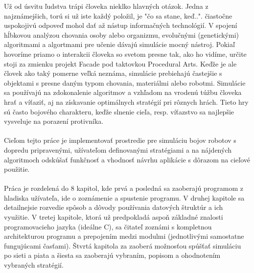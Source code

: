 \indent Už od úsvitu ľudstva trápi človeka nieklko hlavných otázok. Jedna z najznámejšich, torú si už iste každý položil, je "čo sa stane, keď..". čiastočne uspokojivú odpoveď mohol dať až nástup informačných technológií. V spojení hĺbkovou analýzou chovania osoby alebo organizmu, evolučnými (genetickými) algoritmami a algortmami pre učenie dávajú simulácie mocný nástroj. Pokiaľ hovoríme priamo o interakcii človeka so svetom presne tak, ako ho vidíme, určite stoji za zmienku projekt Facade pod taktovkou Procedural Arts. Keďže je ale človek ako taký pomerne veľká neznáma, simulácie prebiehajú častejšie s objektami s presne daným typom chovania, materiálmi alebo robotmi. Simulácie sa používajú na zdokonalenie algoritmov a vzhľadom na vrodenú túžbu človeka hrať a víťaziť, aj na získavanie optimálnych stratégií pri rôznych hrách. Tieto hry sú často bojového charakteru, keďže slnenie cieľa, resp. víťazstvo sa najlepšie vysveluje na porazení protivníka.\\\\
\indent Cieľom tejto práce je implementovať prostredie pre simuláciu bojov robotov s dopredu pripravenými, užívateľom definovanými stratégiami a na nájdených algoritmoch odskúšať funkčnosť a vhodnosť návrhu aplikácie s dôrazom na cieľové použitie. \\\\
\indent Práca je rozdelená do 8 kapitol, kde prvá a posledná sa zaoberajú programom z hladiska užívateľa, ide o zoznámenie a spustenie programu. V druhej kapitole sa detailnejsie rozvedie spôsob a dôvody používania datových štruktúr a ich využitie. V tretej kapitole, ktorá už predpokladá aspoň základné znalosti programovacieho jazyka (ideálne C), sa čitateľ zoznámi s kompletnou architekturou programu a prepojením medzi modulmi (jednotlivými samostatne fungujúcami časťami). Štvrtá kapitola za zaoberá možnosťou spúšťať simuláciu po sieti a piata a šiesta sa zaoberajú vybraním, popisom a ohodnotením vybraných stratégií.
